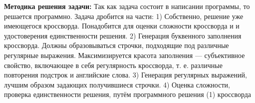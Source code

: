 \documentclass[12pt]{article}
\begin{document}
\textbf{ Методика решения задачи: }
Так как задача состоит в написании программы, то решается программно. Задача дробится на части:
1) Собственно, решение уже имеющегося кроссворда. Понадобится для оценки сложности кроссворда и и удостоверения единственности решения.
2) Генерация буквенного заполнения кроссворда. Должны образовываться строчки, подходящие под различные регулярные выражения. Максимизируется красота заполнения — субъективное свойство, включающее в себя регулярность кроссворда, т. е. различные повторения подстрок и английские слова.
3) Генерация регулярных выражений, лучшим образом задающих получившиеся строчки.
4) Оценка сложности, проверка единственности решения, путём программного решения (1) кроссворда

    \newpage %

        
\end{document}

